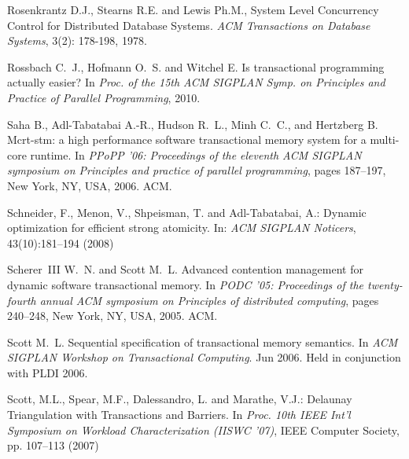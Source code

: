 \begin{thebibliography}{99}
{%


Rosenkrantz D.J.,  Stearns R.E. and Lewis Ph.M., 
System Level Concurrency Control for Distributed Database Systems.
{\it  ACM Transactions on  Database Systems},  3(2): 178-198, 1978.



Rossbach C.~J., Hofmann O.~S. and Witchel E.
\newblock Is transactional programming actually easier?
\newblock In {\em Proc. of the 15th ACM SIGPLAN Symp. on Principles and
  Practice of Parallel Programming}, 2010.


Saha B., Adl-Tabatabai A.-R., Hudson R.~L., Minh C.~C., and
  Hertzberg B.
\newblock Mcrt-stm: a high performance software transactional memory system for
  a multi-core runtime.
\newblock In {\em PPoPP '06: Proceedings of the eleventh ACM SIGPLAN symposium
  on Principles and practice of parallel programming}, pages 187--197, New
  York, NY, USA, 2006. ACM.




 Schneider, F., Menon, V., Shpeisman, T. and Adl-Tabatabai, A.:
 Dynamic optimization for efficient strong atomicity.
In: {\it ACM  SIGPLAN Noticers}, 43(10):181--194  (2008)

Scherer~III W.~N. and Scott M.~L.
\newblock Advanced contention management for dynamic software transactional
  memory.
\newblock In {\em PODC '05: Proceedings of the twenty-fourth annual ACM
  symposium on Principles of distributed computing}, pages 240--248, New York,
  NY, USA, 2005. ACM.




Scott M.~L.
\newblock Sequential specification of transactional memory semantics.
\newblock In {\em ACM SIGPLAN Workshop on Transactional Computing}. Jun 2006.
\newblock Held in conjunction with PLDI 2006.



 Scott, M.L.,  Spear, M.F., Dalessandro, L. and   Marathe, V.J.:
\newblock Delaunay Triangulation with Transactions and Barriers. 
\newblock In {\it Proc.  10th IEEE Int'l Symposium on Workload Characterization (IISWC '07)},
 IEEE Computer Society, pp. 107--113 (2007)



}
\end{thebibliography}
